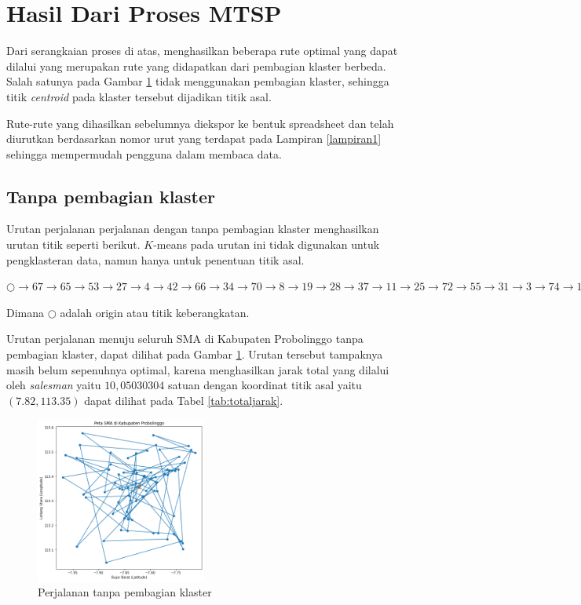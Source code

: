 \section{Hasil Dari Proses MTSP}

Dari serangkaian proses di atas, menghasilkan beberapa rute optimal yang dapat dilalui yang merupakan rute yang didapatkan dari pembagian klaster berbeda. Salah satunya pada Gambar \ref{fig:hasil_mtsp1} tidak menggunakan pembagian klaster, sehingga titik \textit{centroid} pada klaster tersebut dijadikan titik asal.

Rute-rute yang dihasilkan sebelumnya diekspor ke bentuk spreadsheet dan telah diurutkan berdasarkan nomor urut yang terdapat pada Lampiran \ref{lampiran1} sehingga mempermudah pengguna dalam membaca data.

\subsection{Tanpa pembagian klaster}

Urutan perjalanan perjalanan dengan tanpa pembagian klaster menghasilkan urutan titik seperti berikut. $K$-means pada urutan ini tidak digunakan untuk pengklasteran data, namun hanya untuk penentuan titik asal.

\noindent $\bigcirc \to 67 \to 65 \to 53 \to 27\rightarrow4 \to 42 \to 66 \to 34 \to 70 \to 8 \to 19 \to 28 \to 37 \to 11 \to 25 \to 72 \to 55 \to 31 \to 3 \to 74 \to 15 \to 68 \to 20 \to 44 \to 40 \to 16 \to 30 \to 23 \to 24 \to 63 \to 13 \to 29 \to 50 \to 7 \to 54 \to 2 \to 10 \to 52 \to 64 \to 21 \to 62 \to 58 \to 26 \to 1 \to 69 \to 14 \to 45 \to 61 \to 38 \to 59 \to 17 \to 71 \to 18 \to 32 \to 57 \to 73 \to 75 \to 41 \to 39 \to 49 \to 51 \to 6 \to 60 \to 22 \to 33 \to 48 \to 5 \to 35 \to 46 \to 56 \to 36 \to 47 \to 9 \to 12 \to 43 \to \bigcirc$

\noindent Dimana $\bigcirc$ adalah origin atau titik keberangkatan.

Urutan perjalanan menuju seluruh SMA di Kabupaten Probolinggo tanpa pembagian klaster, dapat dilihat pada Gambar \ref{fig:hasil_mtsp1}. Urutan tersebut tampaknya masih belum sepenuhnya optimal, karena menghasilkan jarak total yang dilalui oleh \textit{salesman} yaitu $10,05030304$ satuan dengan koordinat titik asal yaitu $(7.82, 113.35)$ dapat dilihat pada Tabel \ref{tab:totaljarak}.

\begin{figure}[H]
\centering
\includegraphics[width=0.5\textwidth]{Gambar/hasil_mtsp/1}
\caption{Perjalanan tanpa pembagian klaster}
\label{fig:hasil_mtsp1}
\end{figure}

